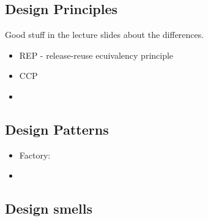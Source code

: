 \documentclass[11pt]{amsart}
\begin{document}
\subsection{Design Principles}
Good stuff in the lecture slides about the differences.
\begin{itemize}
  \item REP - release-reuse ecuivalency principle
  \item CCP
  \item 
\end{itemize}

\subsection{Design Patterns}

\begin{itemize}
  \item Factory:
  \item 
\end{itemize}

\subsection{Design smells}
\end{document}
